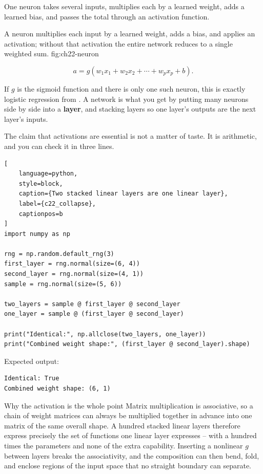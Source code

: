 
One neuron takes several inputs, multiplies each by a learned weight, adds a
learned bias, and passes the total through an activation function.

{A neuron multiplies each input by a learned weight, adds a bias, and applies an activation; without that activation the entire network reduces to a single weighted sum.}
{fig:ch22-neuron}

\[
a = g\!\left(w_1x_1 + w_2x_2 + \cdots + w_px_p + b\right).
\]

If $g$ is the sigmoid function and there is only one such neuron, this is exactly
logistic regression from . A network is what you get
by putting many neurons side by side into a \textbf{layer}, and stacking layers
so one layer's outputs are the next layer's inputs.


The claim that activations are essential is not a matter of taste. It is
arithmetic, and you can check it in three lines.

\begin{lstlisting}[
    language=python,
    style=block,
    caption={Two stacked linear layers are one linear layer},
    label={c22_collapse},
    captionpos=b
]
import numpy as np

rng = np.random.default_rng(3)
first_layer = rng.normal(size=(6, 4))
second_layer = rng.normal(size=(4, 1))
sample = rng.normal(size=(5, 6))

two_layers = sample @ first_layer @ second_layer
one_layer = sample @ (first_layer @ second_layer)

print("Identical:", np.allclose(two_layers, one_layer))
print("Combined weight shape:", (first_layer @ second_layer).shape)
\end{lstlisting}

Expected output:

\begin{lstlisting}[language=text, style=block, caption={Depth without nonlinearity is an illusion}, label={c22_collapse_output}, captionpos=b]
Identical: True
Combined weight shape: (6, 1)
\end{lstlisting}

\begin{ExplainBox}{Why the activation is the whole point}
Matrix multiplication is associative, so a chain of weight matrices can always
be multiplied together in advance into one matrix of the same overall shape. A
hundred stacked linear layers therefore express precisely the set of functions
one linear layer expresses -- with a hundred times the parameters and none of the
extra capability. Inserting a nonlinear $g$ between layers breaks the
associativity, and the composition can then bend, fold, and enclose regions of
the input space that no straight boundary can separate.
\end{ExplainBox}

